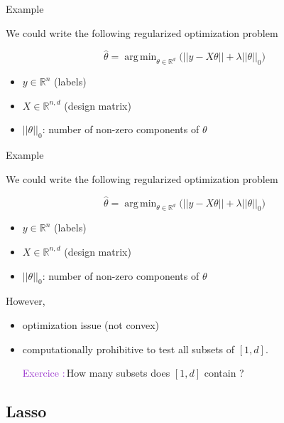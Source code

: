 \documentclass[usenames,dvipsnames]{beamer}
\DeclareMathOperator*{\argmin}{arg\,min}
\newcounter{numexos}%
\newcommand{\exercice}[1]{%
\addtocounter{numexos}{1}%
\textcolor{DarkOrchid}{Exercice\,\thenumexos\,:}\,#1%
}
\begin{document}
\begin{frame}{Example}


    We could write the following regularized optimization problem

    \begin{equation}
	\hat{ \theta} = \argmin_{ \theta\in \mathbb{R}^d }\Big( ||y- X \theta|| + \lambda || \theta||_0 \Big)
    \end{equation}

    \begin{itemize}
	\item $ y\in \mathbb{R}^n$ (labels)
	\item $X\in \mathbb{R}^{n,d}$  (design matrix)
	\item $ ||\theta||_0$: number of non-zero components of $ \theta$
    \end{itemize}

    
\end{frame}

\begin{frame}{Example}


    We could write the following regularized optimization problem

    \begin{equation}
	\hat{ \theta} = \argmin_{ \theta\in \mathbb{R}^d }\Big( ||y- X \theta|| + \lambda || \theta||_0 \Big)
    \end{equation}

    \begin{itemize}
	\item $ y\in \mathbb{R}^n$ (labels)
	\item $X\in \mathbb{R}^{n,d}$  (design matrix)
	\item $ ||\theta||_0$: number of non-zero components of $ \theta$
    \end{itemize}

    However,
    \begin{itemize}
        \item optimization issue (not convex)
	\item computationally prohibitive to test all subsets of $[1, d]$.
	    
	    \exercice{How many subsets does $[1, d]$ contain ?} 
    \end{itemize}
\end{frame}

\subsection{Lasso}%
\label{sub:lasso}
\end{document}

